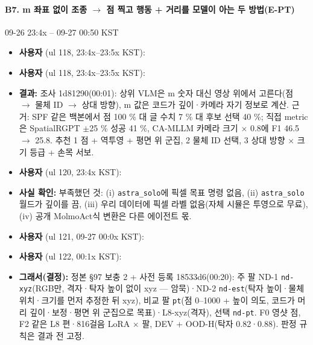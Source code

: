 \paragraph{B7. m 좌표 없이 조종 $\rightarrow$ 점 찍고 행동 + 거리를 모델이 아는 두 방법(E-PT)}
{\small 09-26 23:4x -- 09-27 00:50 KST}
\begin{itemize}
  \item \textbf{사용자} (ul 118, 23:4x--23:5x KST): 
  \item \textbf{사용자} (ul 118, 23:4x--23:5x KST): 
  \item \textbf{결과:} 조사 1d81290(00:01): 상위 VLM은 m 숫자 대신 영상 위에서 고른다(점 $\rightarrow$ 물체 ID $\rightarrow$ 상대 방향), m 값은 코드가 깊이·카메라 자기 정보로 계산. 근거: SPF 같은 백본에서 점 100 \% 대 글 수치 7 \% 대 후보 선택 40 \%; 직접 metric은 SpatialRGPT $\pm$25 \% 성공 41 \%, CA-MLLM 카메라 크기 $\times$ 0.8에 F1 46.5 $\rightarrow$ 25.8. 추천 1 점 + 역투영 + 평면 위 군집, 2 물체 ID 선택, 3 상대 방향 $\times$ 크기 등급 + 손목 서보.
  \item \textbf{사용자} (ul 120, 23:4x KST): 
  \item \textbf{사실 확인:} 부족했던 것: (i) \texttt{astra\_\allowbreak{}solo}에 픽셀 목표 명령 없음, (ii) \texttt{astra\_\allowbreak{}solo} 월드가 깊이를 끔, (iii) 우리 데이터에 픽셀 라벨 없음(자체 시뮬은 투영으로 무료), (iv) 공개 MolmoAct식 변환은 다른 에이전트 몫.
  \item \textbf{사용자} (ul 121, 09-27 00:0x KST): 
  \item \textbf{사용자} (ul 122, 00:1x KST): 
  \item \textbf{그래서(결정):} 정본 §97 보충 2 + 사전 등록 18533d6(00:20): 주 팔 ND-1 \texttt{nd-\allowbreak{}xyz}(RGB만, 격자·탁자 높이 없이 xyz --- 암묵)·ND-2 \texttt{nd-\allowbreak{}est}(탁자 높이·물체 위치·크기를 먼저 추정한 뒤 xyz), 비교 팔 \texttt{pt}(점 0--1000 + 높이 의도, 코드가 머리 깊이·보정·평면 위 군집으로 목표)·L8-xyz(격자), 선택 \texttt{nd-\allowbreak{}pt}. F0 영샷 점, F2 같은 L8 편·816걸음 LoRA $\times$ 팔, DEV + OOD-H(탁자 0.82·0.88). 판정 규칙은 결과 전 고정.

\end{itemize}
